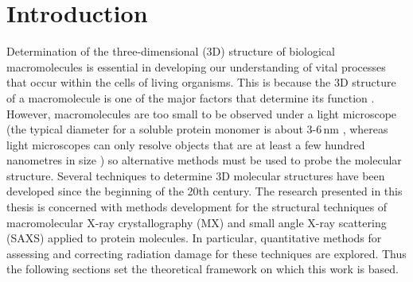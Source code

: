 \chapter{Introduction}
\label{chap:Introduction - Intro chapter}
Determination of the three-dimensional (3D) structure of biological macromolecules is essential in developing our understanding of vital processes that occur within the cells of living organisms.
This is because the 3D structure of a macromolecule is one of the major factors that determine its function \cite{berg2002,hegyi1999}.
However, macromolecules are too small to be observed under a light microscope (the typical diameter for a soluble protein monomer is about 3-6$\,$nm \cite{Philips2015}, whereas light microscopes can only resolve objects that are at least a few hundred nanometres in size \cite{starr2010}) so alternative methods must be used to probe the molecular structure.
Several techniques to determine 3D molecular structures have been developed since the beginning of the 20th century.
The research presented in this thesis is concerned with methods development for the structural techniques of macromolecular X-ray crystallography (MX) and small angle X-ray scattering (SAXS) applied to protein molecules.
In particular, quantitative methods for assessing and correcting radiation damage for these techniques are explored.
Thus the following sections set the theoretical framework on which this work is based.
